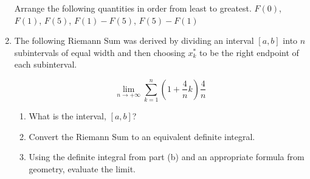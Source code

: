 \documentclass[12pt]{article}
\newif\ifans
\begin{document}
\begin{enumerate}
Arrange the following quantities in order from least to greatest. $F(0)$, $F(1)$, $F(5)$, $F(1)-F(5)$, $F(5)-F(1)$

\ifans{\fbox{$F(5)-F(1)<F(5)<F(0)<F(1)<F(1)-F(5)$}} \fi

\newpage

\item The following Riemann Sum was derived by dividing an interval $[a,b]$ into $n$ subintervals of equal width and then choosing $x_k^*$ to be the right endpoint of each subinterval.

$$\lim_{n \rightarrow +\infty} \sum_{k=1}^n{\left(1+\frac{4}{n}k\right)\frac{4}{n}}$$

\begin{enumerate}

\item What is the interval, $[a,b]$?

\ifans{\fbox{If we consider $f(x)=x$, then the interval is $[1,5]$.}} \fi

\item Convert the Riemann Sum to an equivalent definite integral.

\ifans{\fbox{$\lim_{n \rightarrow +\infty} \sum_{k=1}^n{\left(1+\frac{4}{n}k\right)\frac{4}{n}}=\int_1^5{x} \,dx$}} \fi

\item Using the definite integral from part (b) and an appropriate formula from geometry, evaluate the limit.

\ifans{\fbox{12}} \fi

\end{enumerate}

\ifans{{\bf NOTE:} In number 18, we could have considered $f(x)=1+x$.  In that case, $[a,b]=[0,4]$ and $\lim_{n \rightarrow +\infty} \sum_{k=1}^n{\left(1+\frac{4}{n}k\right)\frac{4}{n}}=\int_0^4{(1+x)} \,dx$.  The value of this definite integral is also 12.} \fi

\end{enumerate}
\end{document}

